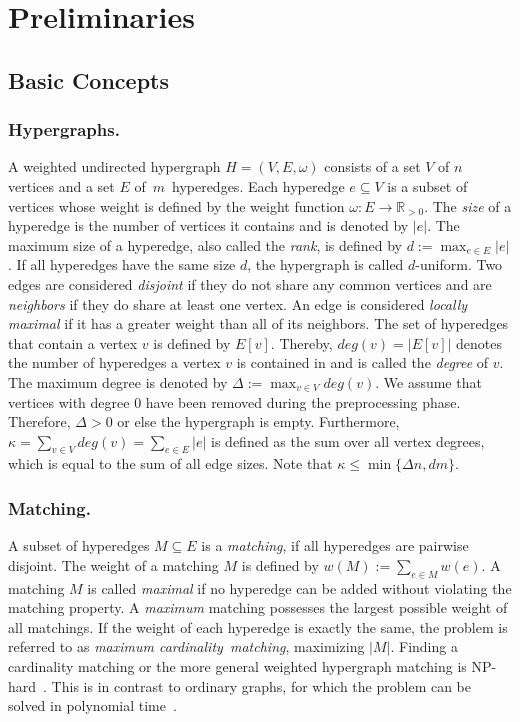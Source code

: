 \documentclass[runningheads]{llncs}
\begin{document}
\section{Preliminaries}\label{sec:prelim}
\subsection{Basic Concepts}
\subsubsection{Hypergraphs.}
A weighted undirected hypergraph $H=(V,E,\omega)$ consists of a set $V$ of $n$ vertices and a set $E$ of~$m$~hyperedges. Each hyperedge $e \subseteq V$ is a subset of vertices whose weight is defined by the weight function $\omega: E\to \mathbb{R}_{> 0}$. %
The \emph{size} of a hyperedge is the number of vertices it contains and is denoted by $\left|e\right|$. The maximum size of a hyperedge, also called the \emph{rank}, is defined by $d := \max_{e \in E}\left|e\right|$. If all hyperedges have the same size $d$, the hypergraph is called $ d$-uniform. 
Two edges are considered \emph{disjoint} if they do not share any common vertices and are \emph{neighbors} if they do share at least one vertex. An edge is considered \emph{locally maximal} if it has a greater weight than all of its neighbors.
The set of hyperedges that contain a vertex $v$ is defined by $E[v]$. Thereby, $deg(v) = |E[v]|$ denotes the number of hyperedges a vertex $v$ is contained in and is called the \emph{degree} of $v$. The maximum degree is denoted by $\Delta := \max_{v \in V}deg(v)$. We assume that vertices with degree $0$ have been removed during the preprocessing phase. Therefore, \hbox{$\Delta > 0$} or else the hypergraph is empty.
Furthermore, $\kappa = \sum_{v \in V} deg(v) = \sum_{e \in E} \left|e\right|$ is defined as the sum over all vertex degrees, which is equal to the sum of all edge sizes. Note that $\kappa \leq \min\{\Delta n, d m\}$.
\subsubsection{Matching.} A subset of hyperedges $M \subseteq E$ is a \emph{matching}, if all hyperedges are pairwise disjoint. The weight of a matching $M$ is defined by $w(M):= \sum_{e\in M}w(e)$. A matching $M$ is called \emph{maximal} if no hyperedge can be added without violating the matching property. A \emph{maximum} matching possesses the largest possible weight of all matchings. If the weight of each hyperedge is exactly the same, the problem is referred to as \emph{maximum cardinality~matching}, maximizing $|M|$. Finding a cardinality matching or the more general weighted hypergraph matching is  NP-hard~\cite{approxresult}.
This is in contrast to ordinary graphs, for which the problem can be solved in polynomial time~\cite{edmonds_1965}.
\end{document}
